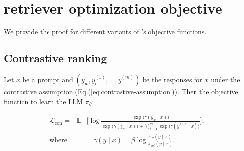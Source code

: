 


\section{\Ours retriever optimization objective}\label{apx:proofs}

We provide the proof for different variants of \Ours's objective functions.

\subsection{Contrastive ranking}\label{apx:proof:contrastive}

\begin{theorem}
Let \( x \) be a prompt and \( (y_w, y^{(1)}_l, ..., y^{(m)}_l)  \) be the responses for \( x \) under the contrastive assumption (Eq.(\ref{eq:contrastive-assumption})).
Then the objective function to learn the LLM \( \pi_\theta \):
\end{theorem}

\begin{equation}
    \begin{aligned}
    \mathcal{L}_{\text{con}} = -\mathbb{E} & \biggl[
    \log \frac{\exp\bigl(\gamma(y_w \mid x)\bigr)}{
        \exp\bigl(\gamma(y_w \mid x)\bigr) + \sum_{i=1}^m \exp\bigl(\gamma(y_l^{(i)} \mid x)\bigr)}
    \biggr], \\
    \text{where } &\quad \gamma(y \mid x) = \beta \log \frac{\pi_\theta(y \mid x)}{\pi_{\mathrm{ref}}(y \mid x)}.
\end{aligned}\label{eq:contrastive}
\end{equation}

